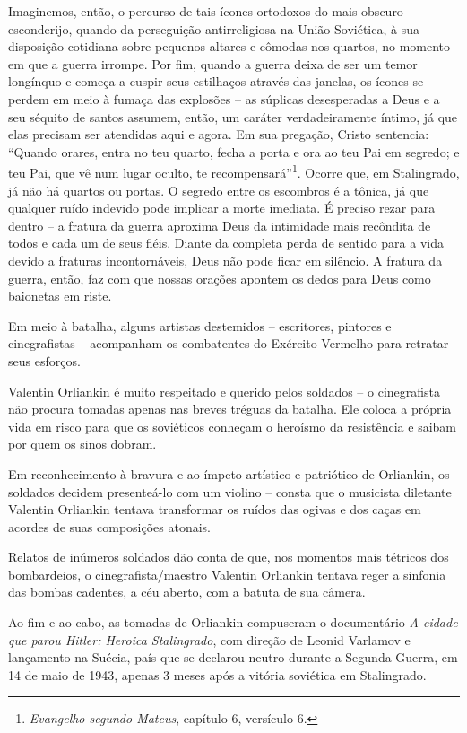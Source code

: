 Imaginemos, então, o percurso de tais ícones ortodoxos do mais obscuro
esconderijo, quando da perseguição antirreligiosa na União Soviética, à
sua disposição cotidiana sobre pequenos altares e cômodas nos quartos,
no momento em que a guerra irrompe. Por fim, quando a guerra deixa de
ser um temor longínquo e começa a cuspir seus estilhaços através das
janelas, os ícones se perdem em meio à fumaça das explosões -- as
súplicas desesperadas a Deus e a seu séquito de santos assumem, então,
um caráter verdadeiramente íntimo, já que elas precisam ser atendidas
aqui e agora. Em sua pregação, Cristo sentencia: ``Quando orares, entra
no teu quarto, fecha a porta e ora ao teu Pai em segredo; e teu Pai, que
vê num lugar oculto, te recompensará''\footnote{\emph{Evangelho segundo
  Mateus}, capítulo 6, versículo 6.}. Ocorre que, em Stalingrado, já não
há quartos ou portas. O segredo entre os escombros é a tônica, já que
qualquer ruído indevido pode implicar a morte imediata. É preciso rezar
para dentro -- a fratura da guerra aproxima Deus da intimidade mais
recôndita de todos e cada um de seus fiéis. Diante da completa perda de
sentido para a vida devido a fraturas incontornáveis, Deus não pode
ficar em silêncio. A fratura da guerra, então, faz com que nossas
orações apontem os dedos para Deus como baionetas em riste.

Em meio à batalha, alguns artistas destemidos -- escritores, pintores e
cinegrafistas -- acompanham os combatentes do Exército Vermelho para
retratar seus esforços.

Valentin Orliankin é muito respeitado e querido pelos soldados -- o
cinegrafista não procura tomadas apenas nas breves tréguas da batalha.
Ele coloca a própria vida em risco para que os soviéticos conheçam o
heroísmo da resistência e saibam por quem os sinos dobram.

Em reconhecimento à bravura e ao ímpeto artístico e patriótico de
Orliankin, os soldados decidem presenteá-lo com um violino -- consta que
o musicista diletante Valentin Orliankin tentava transformar os ruídos
das ogivas e dos caças em acordes de suas composições atonais.

Relatos de inúmeros soldados dão conta de que, nos momentos mais
tétricos dos bombardeios, o cinegrafista/maestro Valentin Orliankin
tentava reger a sinfonia das bombas cadentes, a céu aberto, com a batuta
de sua câmera.

Ao fim e ao cabo, as tomadas de Orliankin compuseram o documentário
\emph{A cidade que parou Hitler: Heroica Stalingrado}, com direção de
Leonid Varlamov e lançamento na Suécia, país que se declarou neutro
durante a Segunda Guerra, em 14 de maio de 1943, apenas 3 meses após a
vitória soviética em Stalingrado.


